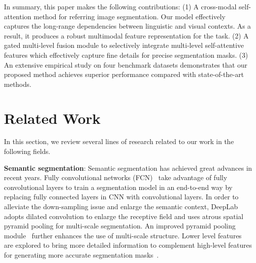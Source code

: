 \documentclass[10pt,twocolumn,letterpaper]{article}
\begin{document}
In summary, this paper makes the following contributions: (1) A cross-modal self-attention method for referring image segmentation. Our model effectively captures the long-range dependencies between linguistic and visual contexts. As a result, it produces a robust multimodal feature representation for the task. (2) A gated multi-level fusion module to selectively integrate multi-level self-attentive features which effectively capture fine details for precise segmentation masks. (3) An extensive empirical study on four benchmark  datasets demonstrates that our proposed method achieves superior performance compared with state-of-the-art methods.



 \section{Related Work}
\label{sec:related}

In this section, we review several lines of research related to our work  in the following fields.


\noindent\textbf{Semantic segmentation}: Semantic segmentation has achieved great advances in recent years. Fully convolutional networks (FCN)~\cite{long2015fully} take advantage of fully convolutional layers to train a segmentation model in an end-to-end way by replacing fully connected layers in CNN with convolutional layers. In order to alleviate the down-sampling issue and enlarge the semantic context, DeepLab~\cite{chen2016deeplab} adopts dilated convolution to enlarge the receptive field and uses atrous spatial pyramid pooling for multi-scale segmentation. An improved pyramid pooling module~\cite{zhao2017pyramid} further enhances the use of multi-scale structure. Lower level features are explored to bring more detailed information to complement high-level features for generating more accurate segmentation masks~\cite{badrinarayanan2015segnet,long2015fully,noh2015learning}.
\end{document}
